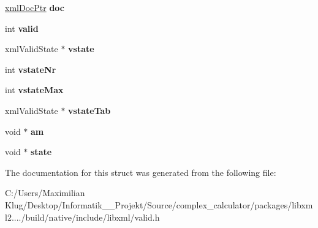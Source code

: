 \begin{DoxyCompactItemize}
\mbox{\hyperlink{struct__xml_doc}{xml\+Doc\+Ptr}} {\bfseries doc}
\item 
\mbox{\label{struct__xml_valid_ctxt_ac31686aaeedb48c46b453f98c51597d2}} 
int {\bfseries valid}
\item 
\mbox{\label{struct__xml_valid_ctxt_a70d2a592a1909a626ae50db98a9ed136}} 
xml\+Valid\+State $\ast$ {\bfseries vstate}
\item 
\mbox{\label{struct__xml_valid_ctxt_af1d9fbfcf068c8dad6349fd677effc22}} 
int {\bfseries vstate\+Nr}
\item 
\mbox{\label{struct__xml_valid_ctxt_a606af121a4d33a9ec572147b17682125}} 
int {\bfseries vstate\+Max}
\item 
\mbox{\label{struct__xml_valid_ctxt_a81fb3ed51e4a63ddaf5a7541f3563ebc}} 
xml\+Valid\+State $\ast$ {\bfseries vstate\+Tab}
\item 
\mbox{\label{struct__xml_valid_ctxt_adef83a3cd73508675a7b1246dc6e9dc1}} 
void $\ast$ {\bfseries am}
\item 
\mbox{\label{struct__xml_valid_ctxt_a88d110c3238a8766436bf8da59bf9d0c}} 
void $\ast$ {\bfseries state}
\end{DoxyCompactItemize}


The documentation for this struct was generated from the following file\+:\begin{DoxyCompactItemize}
\item 
C\+:/\+Users/\+Maximilian Klug/\+Desktop/\+Informatik\+\_\+\_\+\+Projekt/\+Source/complex\+\_\+calculator/packages/libxml2..../build/native/include/libxml/valid.\+h\end{DoxyCompactItemize}
